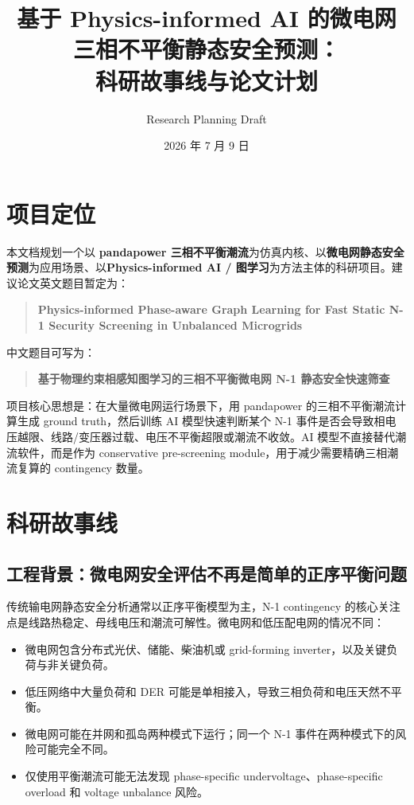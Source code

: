 \documentclass[UTF8,11pt]{ctexart}
\title{基于 Physics-informed AI 的微电网三相不平衡静态安全预测：\\科研故事线与论文计划}
\author{Research Planning Draft}
\date{2026 年 7 月 9 日}
\begin{document}
\maketitle

\section{项目定位}

本文档规划一个以 \textbf{pandapower 三相不平衡潮流}为仿真内核、以\textbf{微电网静态安全预测}为应用场景、以\textbf{Physics-informed AI / 图学习}为方法主体的科研项目。建议论文英文题目暂定为：

\begin{quote}
\textbf{Physics-informed Phase-aware Graph Learning for Fast Static N-1 Security Screening in Unbalanced Microgrids}
\end{quote}

中文题目可写为：

\begin{quote}
\textbf{基于物理约束相感知图学习的三相不平衡微电网 N-1 静态安全快速筛查}
\end{quote}

项目核心思想是：在大量微电网运行场景下，用 pandapower 的三相不平衡潮流计算生成 ground truth，然后训练 AI 模型快速判断某个 N-1 事件是否会导致相电压越限、线路/变压器过载、电压不平衡超限或潮流不收敛。AI 模型不直接替代潮流软件，而是作为 conservative pre-screening module，用于减少需要精确三相潮流复算的 contingency 数量。

\section{科研故事线}

\subsection{工程背景：微电网安全评估不再是简单的正序平衡问题}

传统输电网静态安全分析通常以正序平衡模型为主，N-1 contingency 的核心关注点是线路热稳定、母线电压和潮流可解性。微电网和低压配电网的情况不同：

\begin{itemize}
    \item 微电网包含分布式光伏、储能、柴油机或 grid-forming inverter，以及关键负荷与非关键负荷。
    \item 低压网络中大量负荷和 DER 可能是单相接入，导致三相负荷和电压天然不平衡。
    \item 微电网可能在并网和孤岛两种模式下运行；同一个 N-1 事件在两种模式下的风险可能完全不同。
    \item 仅使用平衡潮流可能无法发现 phase-specific undervoltage、phase-specific overload 和 voltage unbalance 风险。
\end{itemize}
\end{document}
